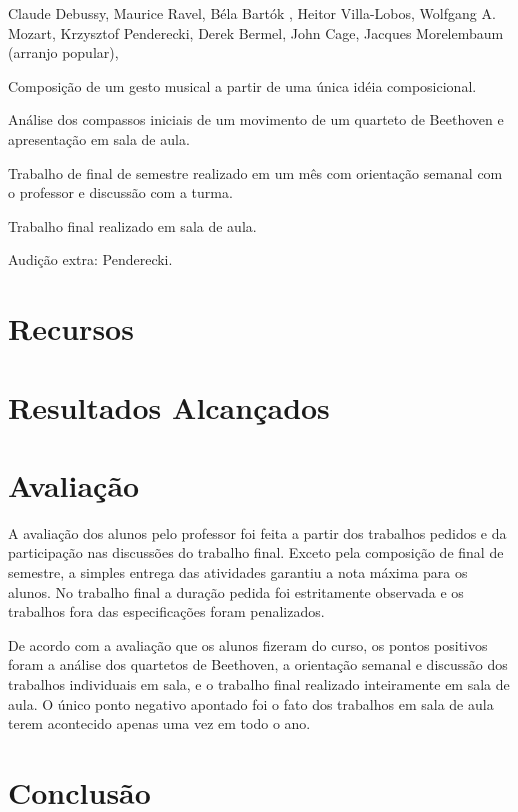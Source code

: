 \documentclass{article}
\begin{document}
Claude Debussy, Maurice Ravel, Béla Bartók , Heitor Villa-Lobos,
Wolfgang A. Mozart, Krzysztof Penderecki, Derek Bermel, John Cage,
Jacques Morelembaum (arranjo popular),

Composição de um gesto musical a partir de uma única idéia
composicional.

Análise dos compassos iniciais de um movimento de um quarteto de
Beethoven e apresentação em sala de aula.

Trabalho de final de semestre realizado em um mês com orientação
semanal com o professor e discussão com a turma.

Trabalho final realizado em sala de aula.

Audição extra: Penderecki.

\section{Recursos}
\label{sec:recursos}

\section{Resultados Alcançados}
\label{sec:result-alcanc}

\section{Avaliação}
\label{sec:avaliacao}

A avaliação dos alunos pelo professor foi feita a partir dos trabalhos
pedidos e da participação nas discussões do trabalho final. Exceto
pela composição de final de semestre, a simples entrega das atividades
garantiu a nota máxima para os alunos. No trabalho final a duração
pedida foi estritamente observada e os trabalhos fora das
especificações foram penalizados.

De acordo com a avaliação que os alunos fizeram do curso, os pontos
positivos foram a análise dos quartetos de Beethoven, a orientação
semanal e discussão dos trabalhos individuais em sala, e o trabalho
final realizado inteiramente em sala de aula. O único ponto negativo
apontado foi o fato dos trabalhos em sala de aula terem acontecido
apenas uma vez em todo o ano.

\section{Conclusão}
\label{sec:conclusao}



\renewcommand{\refname}{Bibliografia}

\nocite{Beethoven1970,Heussenstamm1987,adler89:_study_orches,Kennan1997,stone80:_music_notat_twent_centur}



\end{document}

